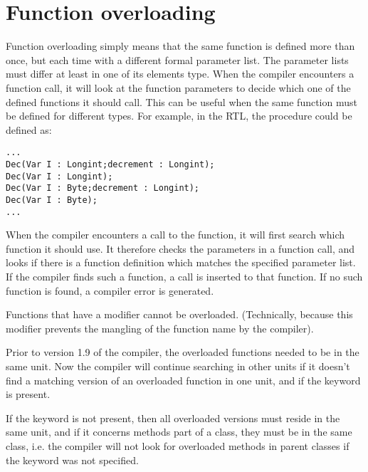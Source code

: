 \section{Function overloading}
Function overloading simply means that the same function is defined more
than once, but each time with a different formal parameter list.
The parameter lists must differ at least in one of its elements type.
When the compiler encounters a function call, it will look at the function
parameters to decide which one of the defined functions it should call.
This can be useful when the same function must be defined for different
types. For example, in the RTL, the   procedure could be
 defined as:
\begin{verbatim}
...
Dec(Var I : Longint;decrement : Longint);
Dec(Var I : Longint);
Dec(Var I : Byte;decrement : Longint);
Dec(Var I : Byte);
...
\end{verbatim}
When the compiler encounters a call to the  function, it will first search
which function it should use. It therefore checks the parameters in a
function call, and looks if there is a function definition which matches the
specified parameter list. If the compiler finds such a function, a call is
inserted to that function. If no such function is found, a compiler error is
generated.

Functions that have a  modifier cannot be overloaded.
(Technically, because this modifier prevents the mangling of
the function name by the compiler).

Prior to version 1.9 of the compiler, the overloaded functions needed to be
in the same unit. Now the compiler will continue searching in other units if
it doesn't find a matching version of an overloaded function in one unit,
and if the  keyword is present. 

If the  keyword is not present, then all overloaded versions 
must reside in the same unit, and if it concerns methods part of a class,
they must be in the same class, i.e. the compiler will not look for
overloaded methods in parent classes if the  keyword was not
specified.


